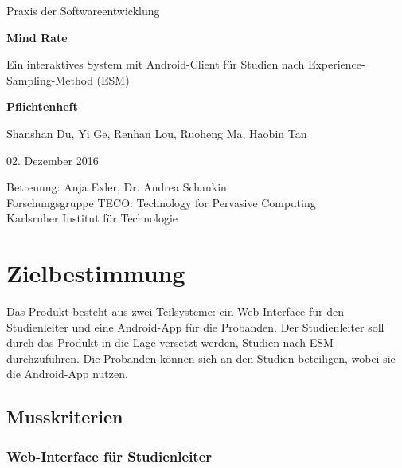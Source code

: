 \documentclass[a4paper]{scrreprt}
\begin{document}
    \begin{center} \large

        Praxis der Softwareentwicklung
        \vspace * {1.5cm}

        \textbf{\huge Mind Rate}

        \vspace*{1cm}


        {\Large Ein interaktives System mit Android-Client f\"ur Studien nach Experience-Sampling-Method (ESM)}

        \vspace*{1cm}

        \textbf{\Large Pflichtenheft}
        \vspace*{2cm}

        Shanshan Du, Yi Ge, Renhan Lou, Ruoheng Ma, Haobin Tan
        \vspace*{1cm}

        02. Dezember 2016
        \vspace*{2.5cm}

        Betreuung: Anja Exler, Dr. Andrea Schankin\\[0.5cm]
        Forschungsgruppe TECO: Technology for Pervasive Computing\\[0.5cm]

        Karlsruher Institut für Technologie
    \end{center}
    \thispagestyle{empty}

    \tableofcontents

    \chapter{Zielbestimmung}

        \noindent Das Produkt besteht aus zwei Teilsysteme: ein \gls{Web-Interface} für den \gls{Studienleiter} und eine \gls{Android-App} für die \gls{Proband}en. Der \gls{Studienleiter} soll durch das Produkt in die Lage versetzt werden, Studien nach ESM durchzuf\"uhren. Die Probanden k\"onnen sich an den Studien beteiligen, wobei sie die \gls{Android-App} nutzen.


        \section{Musskriterien}
            \subsection{\gls{Web-Interface} für \gls{Studienleiter}}
\end{document}
